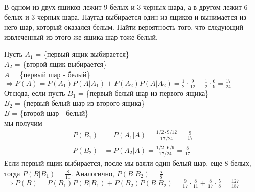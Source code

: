\begin{exercise}[4] В одном из двух ящиков лежит 9 белых и 3 черных шара, а в другом лежит 6 белых и 3 черных шара. Наугад выбирается один из ящиков и вынимается из него шар, который оказался белым. Найти вероятность того, что следующий извлеченный из этого же ящика шар тоже белый.
	
	Пусть $A_1$ = \{первый ящик выбирается\} \\ $A_2$ = \{второй ящик выбирается\} \\ $A$ = \{первый шар - белый\} \\ $\Rightarrow P(A) = P(A_1) P(A | A_1) + P(A_2) P(A | A_2) = \frac{1}{2} \cdot \frac{9}{12} + \frac{1}{2} \cdot \frac{6}{9} = \frac{17}{24}$ \\ Отсюда, если пусть $B_1$ = \{первый белый шар из первого ящика\} \\ $B_2$ = \{первый белый шар из второго ящика\} \\ $B$ = \{второй шар - белый\} \\ мы получим
	\begin{align*}
		P(B_1) & = P(A_1 | A) = \frac{1/2 \cdot 9/12}{17/24} = \frac{9}{17} \\ P(B_2) & = P(A_2 | A) = \frac{1/2 \cdot 6/9}{17/24} = \frac{8}{17}
	\end{align*}
	Если первый ящик выбирается, после мы взяли один белый шар, еще 8 белых, тогда $P(B | B_1) = \frac{8}{11}$. Аналогично, $P(B | B_2) = \frac{5}{8}$ \\ $\Rightarrow P(B) = P(B_1) P(B | B_1) + P(B_2) P(B | B_2) = \frac{9}{17} \cdot \frac{8}{11} + \frac{8}{17} \cdot \frac{5}{8} = \frac{127}{187}$
\end{exercise}

